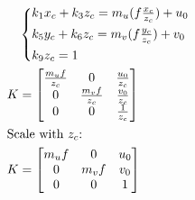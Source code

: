 \documentclass[11pt,a4paper]{article}
\begin{document}
\begin{enumerate}
\begin{align*}
                                               & \begin{cases*}
                                                     k_1 x_c + k_3 z_c = m_u (f \frac{x_c}{z_c}) + u_0 \\
                                                     k_5 y_c + k_6 z_c = m_v (f \frac{y_c}{z_c}) + v_0 \\
                                                     k_9 z_c = 1                                       \\
                                                 \end{cases*}           \\
              K                                & = \begin{bmatrix}
                                                       \frac{m_u f}{z_c} & 0                 & \frac{u_0}{z_c} \\
                                                       0                 & \frac{m_v f}{z_c} & \frac{v_0}{z_c} \\
                                                       0                 & 0                 & \frac{1}{z_c}
                                                   \end{bmatrix}   \\
              \intertext{Scale with $z_c$:}
              K                                & = \begin{bmatrix}
                                                       m_u f & 0     & u_0 \\
                                                       0     & m_v f & v_0 \\
                                                       0     & 0     & 1
                                                   \end{bmatrix}
          \end{align*}

          \newpage


\end{enumerate}
\end{document}
